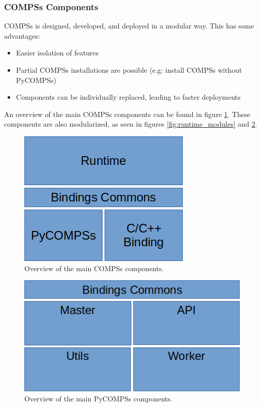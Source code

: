 \subsubsection{COMPSs Components}
\label{subsec:compss_components}
COMPSs is designed, developed, and deployed in a modular way. This has some advantages:
\begin{itemize} 
\item Easier isolation of features
\item Partial COMPSs installations are possible (e.g: install COMPSs without PyCOMPSs)
\item Components can be individually replaced, leading to faster deployments
\end{itemize}
An overview of the main COMPSs components can be found in figure \ref{fig:compss_modules}. These components are also modularized, as seen in figures \ref{fig:runtime_modules} and \ref{fig:pycompss_modules}.
\begin{figure}
\centering
\includegraphics{figures/compss_modules.png}
\caption{Overview of the main COMPSs components.}
\label{fig:compss_modules}
\end{figure}

\begin{figure}
\centering
\includegraphics{figures/pycompss_modules.png}
\caption{Overview of the main PyCOMPSs components.}
\label{fig:pycompss_modules}
\end{figure}

